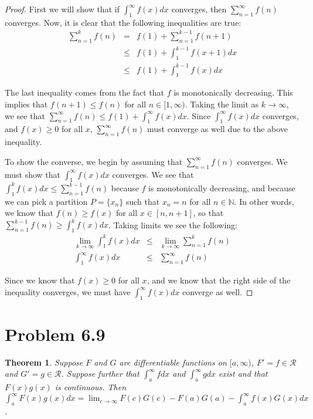 \documentclass[psamsfonts]{amsart}
\newtheorem{thm}{Theorem}[section]
\theoremstyle{definition}
\theoremstyle{remark}
\numberwithin{equation}{section}
\begin{document}
\begin{proof}
First we will show that if $\int_1^\infty f(x) dx$ converges, then $\sum_{n=1}^\infty f(n)$ converges. Now, it is clear that the following inequalities are true:
\begin{eqnarray}
\sum_{n=1}^k f(n) &=& f(1) + \sum_{n=1}^{k-1} f(n+1) \\
&\leq& f(1) + \int_1^{k-1} f(x+1) dx \\
&\leq& f(1) + \int_1^{k-1} f(x) dx
\end{eqnarray}

The last inequality comes from the fact that $f$ is monotonically decreasing. This implies that $f(n+1) \leq f(n)$ for all $n \in [1, \infty)$. Taking the limit as $k \to \infty$, we see that $\sum_{n=1}^\infty f(n) \leq f(1) + \int_1^\infty f(x) dx$. Since $\int_1^\infty f(x) dx$ converges, and $f(x) \geq 0$ for all $x$, $\sum_{n=1}^\infty f(n)$ must converge as well due to the above inequality. 

To show the converse, we begin by assuming that $\sum_{n=1}^\infty f(n)$ converges. We must show that $\int_1^\infty f(x) dx$ converges. We see that $\int_1^k f(x) dx \leq \sum_{n=1}^{k-1} f(n)$ because $f$ is monotonically decreasing, and because we can pick a partition $P = \{ x_n \}$ such that $x_n = n$ for all $n \in \mathbb{N}$. In other words, we know that $f(n) \geq f(x)$ for all $x \in [n,n+1]$, so that $\sum_{n=1}^{k-1} f(n) \geq \int_{1}^k f(x) dx$. Taking limits we see the following:
\begin{eqnarray}
\lim_{k \to \infty} \int_{1}^k f(x) dx &\leq& \lim_{k \to \infty} \sum_{n = 1}^k f(n) \\
\int_1^\infty f(x) dx &\leq& \sum_{n=1}^\infty f(n)
\end{eqnarray}

Since we know that $f(x) \geq 0$ for all $x$, and we know that the right side of the inequality converges, we must have $\int_1^\infty f(x) dx$ converge as well.
\end{proof}

\section{Problem 6.9}

\begin{thm}
Suppose $F$ and $G$ are differentiable functions on $[a,\infty)$, $F' = f \in \mathscr{R}$ and $G' = g \in \mathscr{R}$. Suppose further that $\int_a^\infty f dx$ and $\int_a^\infty g dx$ exist and that $F(x)g(x)$ is continuous. Then $\int_a^\infty F(x) g(x) dx = \lim_{c \to \infty} F(c) G(c) - F(a) G(a) - \int_a^\infty f(x) G(x) dx$.
\end{thm}
\end{document}
